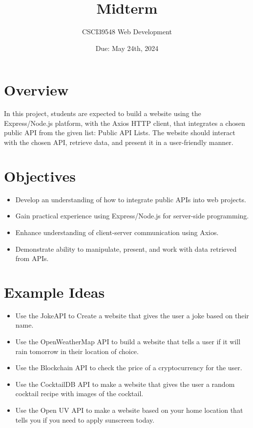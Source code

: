 \documentclass{article}
\title{Midterm}
\author{CSCI39548 Web Development}
\date{Due: May 24th, 2024}
\begin{document}
\maketitle


\section{Overview}
In this project, students are expected to build a website using the\\
Express/Node.js platform, with the Axios HTTP client, that integrates a chosen\\
public API from the given list: Public API Lists. The website should interact\\
with the chosen API, retrieve data, and present it in a user-friendly manner.


\section{Objectives}
\begin{itemize}
  \item Develop an understanding of how to integrate public APIs into web projects.
  \item Gain practical experience using Express/Node.js for server-side programming.
  \item Enhance understanding of client-server communication using Axios.
  \item Demonstrate ability to manipulate, present, and work with data retrieved from APIs.
\end{itemize}


\section{Example Ideas}
\begin{itemize}
  \item Use the JokeAPI to Create a website that gives the user a joke based on their name.
  \item  Use the OpenWeatherMap API to build a website that tells a user if it will rain tomorrow in their location of choice.
  \item Use the Blockchain API to check the price of a cryptocurrency for the user.
  \item Use the CocktailDB API to make a website that gives the user a random cocktail recipe with images of the cocktail.
  \item Use the Open UV API to make a website based on your home location that tells you if you need to apply sunscreen today.
\end{itemize}
\end{document}
